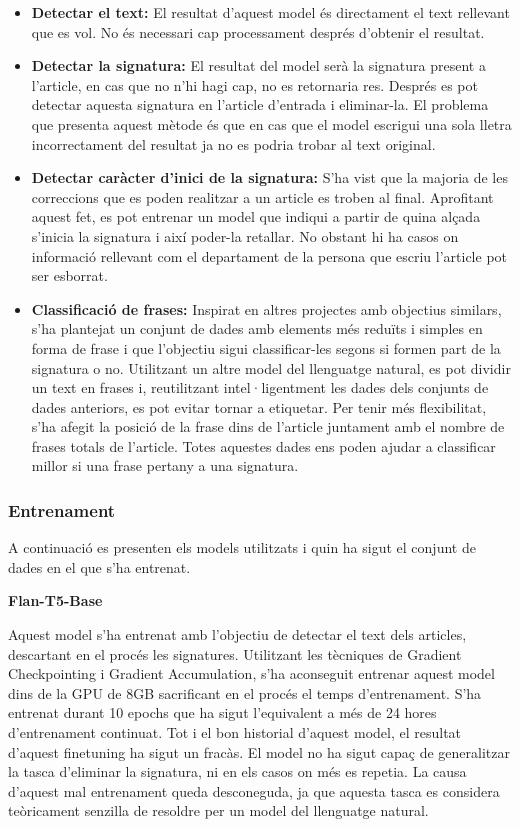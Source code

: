 \begin{itemize}
     \item \textbf{Detectar el text:} El resultat d'aquest model és directament el text rellevant que es vol. No és necessari cap processament després d'obtenir el resultat.
     \item \textbf{Detectar la signatura:} El resultat del model serà la signatura present a l'article, en cas que no n'hi hagi cap, no es retornaria res. Després es pot detectar aquesta signatura en l'article d'entrada i eliminar-la. El problema que presenta aquest mètode és que en cas que el model escrigui una sola lletra incorrectament del resultat ja no es podria trobar al text original.
     \item \textbf{Detectar caràcter d'inici de la signatura:} S'ha vist que la majoria de les correccions que es poden realitzar a un article es troben al final. Aprofitant aquest fet, es pot entrenar un model que indiqui a partir de quina alçada s'inicia la signatura i així poder-la retallar. No obstant hi ha casos on informació rellevant com el departament de la persona que escriu l'article pot ser esborrat.
     \item \textbf{Classificació de frases:} Inspirat en altres projectes amb objectius similars, s'ha plantejat un conjunt de dades amb elements més reduïts i simples en forma de frase i que l'objectiu sigui classificar-les segons si formen part de la signatura o no. Utilitzant un altre model del llenguatge natural, es pot dividir un text en frases i, reutilitzant intel·ligentment les dades dels conjunts de dades anteriors, es pot evitar tornar a etiquetar. Per tenir més flexibilitat, s'ha afegit la posició de la frase dins de l'article juntament amb el nombre de frases totals de l'article. Totes aquestes dades ens poden ajudar a classificar millor si una frase pertany a una signatura.
\end{itemize}

\subsubsection{Entrenament}
A continuació es presenten els models utilitzats i quin ha sigut el conjunt de dades en el que s'ha entrenat.

\textbf{Flan-T5-Base}

Aquest model s'ha entrenat amb l'objectiu de detectar el text dels articles, descartant en el procés les signatures. Utilitzant les tècniques de Gradient Checkpointing i Gradient Accumulation, s'ha aconseguit entrenar aquest model dins de la GPU de 8GB sacrificant en el procés el temps d'entrenament. S'ha entrenat durant 10 epochs que ha sigut l'equivalent a més de 24 hores d'entrenament continuat.
Tot i el bon historial d'aquest model, el resultat d'aquest finetuning ha sigut un fracàs. El model no ha sigut capaç de generalitzar la tasca d'eliminar la signatura, ni en els casos on més es repetia. La causa d'aquest mal entrenament queda desconeguda, ja que aquesta tasca es considera teòricament senzilla de resoldre per un model del llenguatge natural.

